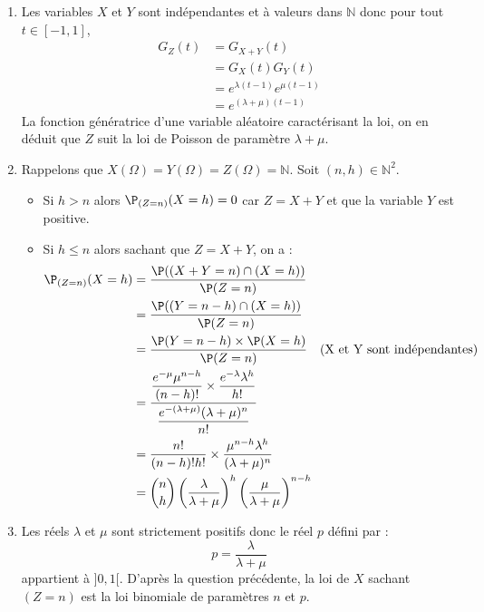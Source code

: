 \documentclass[a4paper,10pt]{report}
\begin{document}
\corr \begin{enumerate}
\item Les variables $X$ et $Y$ sont indépendantes et à valeurs dans $\mathbb{N}$ donc pour tout $t \in [-1,1]$,
\begin{align*}
G_Z(t) & = G_{X+Y}(t) \\
& = G_X(t) G_Y(t) \\
& = e^{\lambda (t-1)} e^{\mu (t-1)} \\
& = e^{(\lambda + \mu) (t-1)} 
\end{align*}
La fonction génératrice d'une variable aléatoire caractérisant la loi, on en déduit que $Z$ suit la loi de Poisson de paramètre $\lambda + \mu$.

\item Rappelons que $X(\Omega)= Y(\Omega) =Z(\Omega)= \mathbb{N}$. Soit $(n,h) \in \mathbb{N}^2$.
\begin{itemize}
\item Si $h>n$ alors $\P_{(Z=n)}(X=h) = 0$ car $Z=X+Y$ et que la variable $Y$ est positive.
\item Si $h \leq n$ alors sachant que $Z=X+Y$, on a :
\begin{align*}
 \P_{(Z=n)}(X=h)& = \dfrac{\P((X+Y=n) \cap (X=h))}{\P(Z=n)} \\
& = \dfrac{\P((Y=n-h) \cap (X=h))}{\P(Z=n)} \\
& = \dfrac{\P(Y=n-h) \times \P(X=h)}{\P(Z=n)}  \quad \hbox{(X et Y sont indépendantes)}\\
&= \dfrac{\dfrac{e^{-\mu}\mu^{n-h}}{(n-h)!} \times \dfrac{e^{-\lambda}\lambda^h}{h!}}{\dfrac{e^{-(\lambda+ \mu)}(\lambda+\mu)^n}{n!}} \\
& = \dfrac{n!}{(n-h)!h!} \times \dfrac{\mu^{n-h} \lambda^h}{(\lambda+\mu)^n} \\
& = \binom{n}{h} \left(\dfrac{\lambda}{\lambda+\mu}\right)^h \left(\dfrac{\mu}{\lambda+ \mu}\right)^{n-h}
\end{align*}
\end{itemize}
\item Les réels $\lambda$ et $\mu$ sont strictement positifs donc le réel $p$ défini par :
$$ p = \dfrac{\lambda}{\lambda+\mu}$$
appartient à $]0,1[$. D'après la question précédente, la loi de $X$ sachant $(Z=n)$ est la loi binomiale de paramètres $n$ et $p$.
\end{enumerate}
\end{document}
